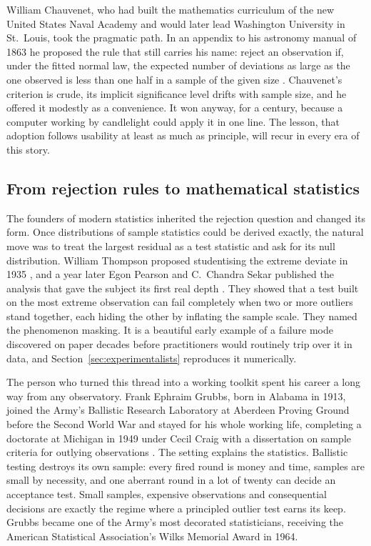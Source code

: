 William Chauvenet, who had built the mathematics curriculum of the new United
States Naval Academy and would later lead Washington University in St.\
Louis, took the pragmatic path. In an appendix to his astronomy manual of
1863 he proposed the rule that still carries his name: reject an observation
if, under the fitted normal law, the expected number of deviations as large
as the one observed is less than one half in a sample of the given size
\citep{chauvenet1863}. Chauvenet's criterion is crude, its implicit
significance level drifts with sample size, and he offered it modestly as a
convenience. It won anyway, for a century, because a computer working by
candlelight could apply it in one line. The lesson, that adoption follows
usability at least as much as principle, will recur in every era of this
story.

\subsection{From rejection rules to mathematical statistics}

The founders of modern statistics inherited the rejection question and
changed its form. Once distributions of sample statistics could be derived
exactly, the natural move was to treat the largest residual as a test
statistic and ask for its null distribution. William Thompson proposed
studentising the extreme deviate in 1935 \citep{thompson1935}, and a year
later Egon Pearson and C.\ Chandra Sekar published the analysis that gave
the subject its first real depth \citep{pearson1936}. They showed that a test built on the most
extreme observation can fail completely when two or more outliers stand
together, each hiding the other by inflating the sample scale. They named the
phenomenon masking. It is a beautiful early example of a failure mode
discovered on paper decades before practitioners would routinely trip over it
in data, and Section~\ref{sec:experimentalists} reproduces it numerically.

The person who turned this thread into a working toolkit spent his career a
long way from any observatory. Frank Ephraim Grubbs, born in Alabama in 1913,
joined the Army's Ballistic Research Laboratory at Aberdeen Proving Ground
before the Second World War and stayed for his whole working life, completing
a doctorate at Michigan in 1949 under Cecil Craig with a dissertation on
sample criteria for outlying observations \citep{grubbs1950}. The setting
explains the statistics. Ballistic testing destroys its own sample: every
fired round is money and time, samples are small by necessity, and one
aberrant round in a lot of twenty can decide an acceptance test. Small
samples, expensive observations and consequential decisions are exactly the
regime where a principled outlier test earns its keep. Grubbs became one of
the Army's most decorated statisticians, receiving the American Statistical
Association's Wilks Memorial Award in 1964.

